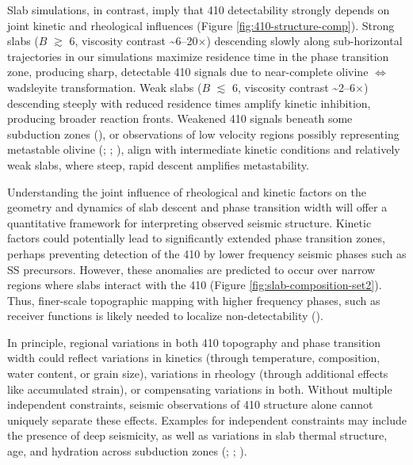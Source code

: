 \documentclass[
  paper=a4,
  ,captions=tableheading
]{scrartcl}
\begin{document}
Slab simulations, in contrast, imply that 410 detectability strongly
depends on joint kinetic and rheological influences (Figure
\ref{fig:410-structure-comp}). Strong slabs (\(B\) \(\gtrsim\) 6,
viscosity contrast \textasciitilde6--20\(\times\)) descending slowly
along sub-horizontal trajectories in our simulations maximize residence
time in the phase transition zone, producing sharp, detectable 410
signals due to near-complete olivine \(\Leftrightarrow\) wadsleyite
transformation. Weak slabs (\(B\) \(\lesssim\) 6, viscosity contrast
\textasciitilde2--6\(\times\)) descending steeply with reduced residence
times amplify kinetic inhibition, producing broader reaction fronts.
Weakened 410 signals beneath some subduction zones
(), or
observations of low velocity regions possibly representing metastable
olivine (;
;
), align with intermediate
kinetic conditions and relatively weak slabs, where steep, rapid descent
amplifies metastability.

Understanding the joint influence of rheological and kinetic factors on
the geometry and dynamics of slab descent and phase transition width
will offer a quantitative framework for interpreting observed seismic
structure. Kinetic factors could potentially lead to significantly
extended phase transition zones, perhaps preventing detection of the 410
by lower frequency seismic phases such as SS precursors. However, these
anomalies are predicted to occur over narrow regions where slabs
interact with the 410 (Figure \ref{fig:slab-composition-set2}). Thus,
finer-scale topographic mapping with higher frequency phases, such as
receiver functions is likely needed to localize non-detectability
().

In principle, regional variations in both 410 topography and phase
transition width could reflect variations in kinetics (through
temperature, composition, water content, or grain size), variations in
rheology (through additional effects like accumulated strain), or
compensating variations in both. Without multiple independent
constraints, seismic observations of 410 structure alone cannot uniquely
separate these effects. Examples for independent constraints may include
the presence of deep seismicity, as well as variations in slab thermal
structure, age, and hydration across subduction zones
(;
;
).
\end{document}
